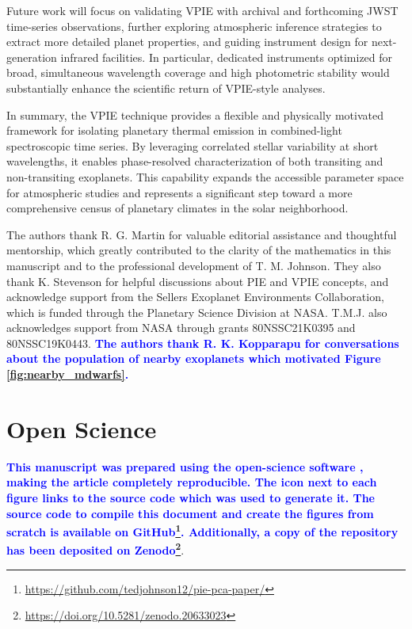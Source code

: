 \documentclass[twocolumn,linenumbers]{aastex7}
\newcommand{\update}[1]{\textcolor{blue}{\bf #1}}
\newcommand{\ghurl}{\url{https://github.com/tedjohnson12/pie-pca-paper/}}
\newcommand{\zenodourl}{\url{https://doi.org/10.5281/zenodo.20633023}}
\begin{document}
Future work will focus on validating VPIE with archival and forthcoming JWST time-series observations, further exploring atmospheric inference strategies to extract more detailed planet properties, and guiding instrument design for next-generation infrared facilities. In particular, dedicated instruments optimized for broad, simultaneous wavelength coverage and high photometric stability would substantially enhance the scientific return of VPIE-style analyses.

In summary, the VPIE technique provides a flexible and physically motivated framework for isolating planetary thermal emission in combined-light spectroscopic time series. By leveraging correlated stellar variability at short wavelengths, it enables phase-resolved characterization of both transiting and non-transiting exoplanets. This capability expands the accessible parameter space for atmospheric studies and represents a significant step toward a more comprehensive census of planetary climates in the solar neighborhood.

\begin{acknowledgments}
The authors thank R. G. Martin for valuable editorial assistance and thoughtful mentorship, which greatly contributed to the clarity of the mathematics in this manuscript and to the professional development of T. M. Johnson. They also thank K. Stevenson for helpful discussions about PIE and VPIE concepts, and acknowledge support from the Sellers Exoplanet Environments Collaboration, which is funded through the Planetary Science Division at NASA. T.M.J. also acknowledges support from NASA through grants 80NSSC21K0395 and 80NSSC19K0443. \update{The authors thank R. K. Kopparapu for conversations about the population of nearby exoplanets which motivated Figure \ref{fig:nearby_mdwarfs}.}

\end{acknowledgments}
\section*{Open Science}
\update{This manuscript was prepared using the open-science software \href{https://show-your.work/en/latest/intro/}{\showyourwork} \citep{luger2021}, making the article completely reproducible. The \GitHubIcon icon next to each figure links to the source code which was used to generate it. The source code to compile this document and create the figures from scratch is available on GitHub\footnote{\ghurl}. Additionally, a copy of the repository has been deposited on Zenodo\footnote{\zenodourl}}.
\end{document}
